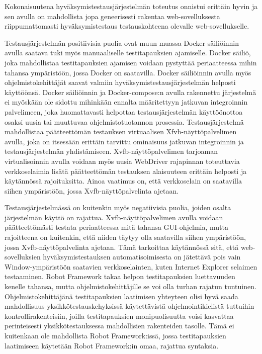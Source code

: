   Kokonaisuutena hyväksymistestausjärjestelmän toteutus onnistui erittäin hyvin ja sen avulla on mahdollista jopa geneerisesti rakentaa web-sovelluksesta riippumattomasti hyväksymistestaus testauskohteena olevalle web-sovellukselle.

  Testausjärjestelmän positiivisia puolia ovat muun muassa Docker säiliöinnin avulla saatava tuki myös manuaaliselle testitapauksien ajamiselle.
  Docker säiliö, joka mahdollistaa testitapauksien ajamisen voidaan pystyttää periaatteessa mihin tahansa ympäristöön, jossa Docker on saatavilla.
  Docker säiliöinnin avulla myös ohjelmistokehittäjät saavat valmiin hyväksymistestausjärjestelmän helposti käyttöönsä.
  Docker säiliöinnin ja Docker-compose:n avulla rakennettu järjestelmä ei myöskään ole sidottu mihinkään ennalta määritettyyn jatkuvan integroinnin palvelimeen, joka huomattavasti helpottaa testausjärjestelmän käyttöönottoa osaksi uusia tai muuttuvaa ohjelmistotuotannon prosessia.
  Testausjärjestelmä mahdollistaa päätteettömän testauksen virtuaalisen Xfvb-näyttöpalvelimen avulla, joka on itsessään erittäin tarvittu ominaisuus jatkuvan integroinnin ja testausjärjestelmän yhdistämiseen.
  Xvfb-näyttöpalvelimen tarjoaman virtualisoinnin avulla voidaan myös uusia WebDriver rajapinnan toteuttavia verkkoselaimia lisätä päätteettömän testauksen alaisuuteen erittäin helposti ja käytännössä rajoituksitta.
  Ainoa vaatimus on, että verkkoselain on saatavilla siihen ympäristöön, jossa Xvfb-näyttöpalvelinta ajetaan.

  Testausjärjestelmässä on kuitenkin myös negatiivisia puolia, joiden osalta järjestelmän käyttö on rajattua.
  Xvfb-näyttöpalvelimen avulla voidaan päätteettömästi testata periaatteessa mitä tahansa GUI-ohjelmia, mutta rajoitteena on kuitenkin, että niiden täytyy olla saatavilla siihen ympäristöön, jossa Xvfb-näyttöpalvelinta ajetaan.
  Tämä tarkoittaa käytännössä sitä, että web-sovelluksien hyväksymistestauksen automatisoimisesta on jätettävä pois vain Window-ympäristöön saatavien verkkoselainten, kuten Internet Explorer selaimen testaaminen.
  Robot Framework takaa helpon testitapauksien luettavuuden kenelle tahansa, mutta ohjelmistokehittäjille se voi olla turhan rajatun tuntuinen.
  Ohjelmistokehittäjänä testitapauksien laatimisen yhteyteen olisi hyvä saada mahdollisuus yksikkötestauskehyksissä käytettävistä ohjelmointikielistä tuttuihin kontrollirakenteisiin, joilla testitapauksien monipuolisuutta voisi kasvattaa perinteisesti yksikkötestauksessa mahdollisien rakenteiden tasolle.
  Tämä ei kuitenkaan ole mahdollista Robot Framework:issä, jossa testitapauksien laatimiseen käytetään Robot Framework:in omaa, rajattua syntaksia.

